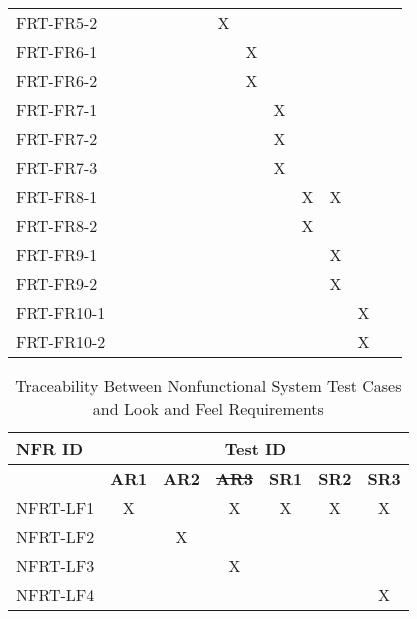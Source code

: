 \documentclass[12pt, titlepage]{article}
\begin{document}
\begin{landscape}
\begin{longtable}{|l|ccccccccccc|}
    FRT-FR5-2 & ~ & ~ & ~ & ~ & X & ~ & ~ & ~ & ~ & ~ & ~ \\
    FRT-FR6-1 & ~ & ~ & ~ & ~ & ~ & X & ~ & ~ & ~ & ~ & ~ \\
    FRT-FR6-2 & ~ & ~ & ~ & ~ & ~ & X & ~ & ~ & ~ & ~ & ~ \\
    FRT-FR7-1 & ~ & ~ & ~ & ~ & ~ & ~ & X & ~ & ~ & ~ & ~ \\
    FRT-FR7-2 & ~ & ~ & ~ & ~ & ~ & ~ & X & ~ & ~ & ~ & ~ \\
    FRT-FR7-3 & ~ & ~ & ~ & ~ & ~ & ~ & X & ~ & ~ & ~ & ~ \\
    FRT-FR8-1 & ~ & ~ & ~ & ~ & ~ & ~ & ~ & X & X & ~ & ~ \\
    FRT-FR8-2 & ~ & ~ & ~ & ~ & ~ & ~ & ~ & X & ~ & ~ & ~ \\
    FRT-FR9-1 & ~ & ~ & ~ & ~ & ~ & ~ & ~ & ~ & X & ~ & ~ \\
    FRT-FR9-2 & ~ & ~ & ~ & ~ & ~ & ~ & ~ & ~ & X & ~ & ~ \\
    FRT-FR10-1 & ~ & ~ & ~ & ~ & ~ & ~ & ~ & ~ & ~ & X & ~ \\
    FRT-FR10-2 & ~ & ~ & ~ & ~ & ~ & ~ & ~ & ~ & ~ & X & ~ \\
    \hline
  \end{longtable}

  \newpage

  \begin{longtable}{|l|cccccc|}
		\caption{Traceability Between Nonfunctional System Test Cases and Look and Feel Requirements} \\
		\hline
    \textbf{NFR ID}   & \multicolumn{6}{c|}{\textbf{Test ID}} \\
    \hline
    ~ & \textbf{AR1} & \textbf{AR2} & \sout{\textbf{AR3}} & \textbf{SR1} & \textbf{SR2} & \textbf{SR3} \\
    \hline
    NFRT-LF1 & X & ~ & X & X & X & X \\
    NFRT-LF2 & ~ & X & ~ & ~ & ~ & ~ \\
    NFRT-LF3 & ~ & ~ & X & ~ & ~ & ~ \\
    NFRT-LF4 & ~ & ~ & ~ & ~ & ~ & X \\
    \hline
  \end{longtable}


\end{landscape}
\end{document}
